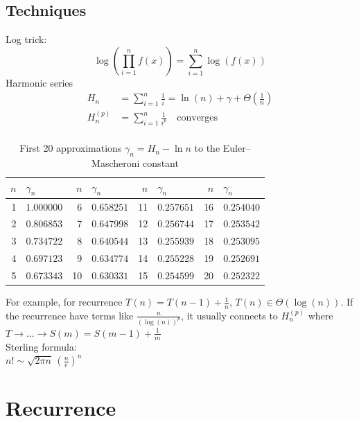 \documentclass[9pt]{extarticle}
\begin{document}
\subsection{Techniques}
Log trick: 
\[\log(\prod_{i=1}^{n} f(x)) = \sum_{i=1}^{n} \log(f(x))\]
Harmonic series
\begin{align*}
    H_n&= \sum_{i=1}^{n}\frac{1}{i} = \ln(n) + \gamma + \Theta(\frac{1}{n})\\
    H^{(p)}_n &= \sum_{i=1}^{n}\frac{1}{i^p}\quad \text{converges}\\
\end{align*}
\begin{table}[h!]\centering
    \renewcommand{\arraystretch}{1.1}
    \setlength{\tabcolsep}{6pt}
    \begin{tabular}{r l r l r l r l}
    $n$ & $\gamma_n$ & $n$ & $\gamma_n$ & $n$ & $\gamma_n$ & $n$ & $\gamma_n$ \\\hline
    1  & $1.000000$ & 6  & $0.658251$ & 11 & $0.257651$ & 16 & $0.254040$ \\
    2  & $0.806853$ & 7  & $0.647998$ & 12 & $0.256744$ & 17 & $0.253542$ \\
    3  & $0.734722$ & 8  & $0.640544$ & 13 & $0.255939$ & 18 & $0.253095$ \\
    4  & $0.697123$ & 9  & $0.634774$ & 14 & $0.255228$ & 19 & $0.252691$ \\
    5  & $0.673343$ & 10 & $0.630331$ & 15 & $0.254599$ & 20 & $0.252322$ \\
    \hline
    \end{tabular}
    \caption{First 20 approximations $\gamma_n = H_n - \ln n$ to the Euler--Mascheroni constant}
    \end{table}
    
For example, for recurrence $T(n) = T(n-1) + \frac{1}{n}$, $T(n) \in \Theta(\log(n))$. If the recurrence have terms like
$\frac{n}{(\log(n))^p}$, it usually connects to $H_n^{(p)}$ where $T\rightarrow ... \rightarrow S(m) = S(m-1) + \frac{1}{m}$\\
Sterling formula:\\
\( n! \sim \sqrt{2\pi n}\,\left(\frac{n}{e}\right)^n \)\\
\newpage
\section{Recurrence}
\end{document}
